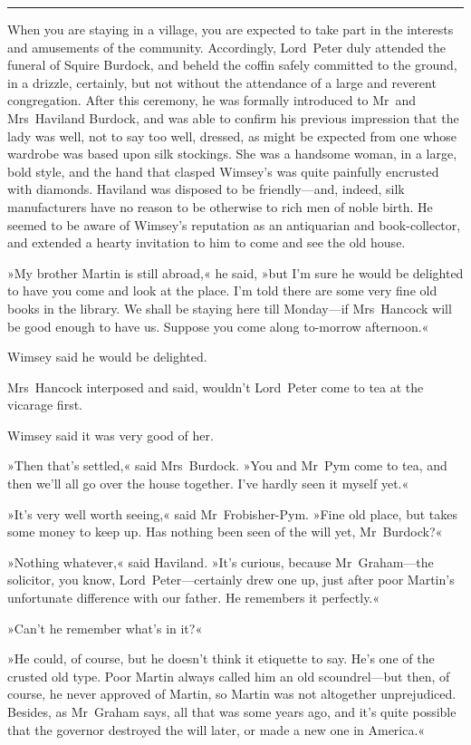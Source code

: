 \noindent\hfil\rule{0.5\textwidth}{.4pt}\hfil 

When you are staying in a village, you are expected to take part in the interests and amusements of the community. Accordingly, Lord~Peter duly attended the funeral of Squire Burdock, and beheld the coffin safely committed to the ground, in a drizzle, certainly, but not without the attendance of a large and reverent congregation. After this ceremony, he was formally introduced to Mr~and Mrs~Haviland Burdock, and was able to confirm his previous impression that the lady was well, not to say too well, dressed, as might be expected from one whose wardrobe was based upon silk stockings. She was a handsome woman, in a large, bold style, and the hand that clasped Wimsey's was quite painfully encrusted with diamonds. Haviland was disposed to be friendly—and, indeed, silk manufacturers have no reason to be otherwise to rich men of noble birth. He seemed to be aware of Wimsey's reputation as an antiquarian and book-collector, and extended a hearty invitation to him to come and see the old house.

»My brother Martin is still abroad,« he said, »but I'm sure he would be delighted to have you come and look at the place. I'm told there are some very fine old books in the library. We shall be staying here till Monday—if Mrs~Hancock will be good enough to have us. Suppose you come along to-morrow afternoon.«

Wimsey said he would be delighted.

Mrs~Hancock interposed and said, wouldn't Lord~Peter come to tea at the vicarage first.

Wimsey said it was very good of her.

»Then that's settled,« said Mrs~Burdock. »You and Mr~Pym come to tea, and then we'll all go over the house together. I've hardly seen it myself yet.«

»It's very well worth seeing,« said Mr~Frobisher-Pym. »Fine old place, but takes some money to keep up. Has nothing been seen of the will yet, Mr~Burdock?«

»Nothing whatever,« said Haviland. »It's curious, because Mr~Graham—the solicitor, you know, Lord~Peter—certainly drew one up, just after poor Martin's unfortunate difference with our father. He remembers it perfectly.«

»Can't he remember what's in it?«

»He could, of course, but he doesn't think it etiquette to say. He's one of the crusted old type. Poor Martin always called him an old scoundrel—but then, of course, he never approved of Martin, so Martin was not altogether unprejudiced. Besides, as Mr~Graham says, all that was some years ago, and it's quite possible that the governor destroyed the will later, or made a new one in America.«

